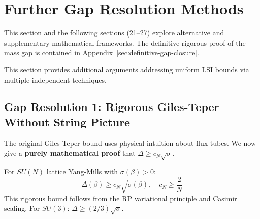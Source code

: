 \section{Further Gap Resolution Methods}
\label{sec:complete-resolution}

\begin{remark}
This section and the following sections (21--27) explore alternative and supplementary mathematical frameworks. The definitive rigorous proof of the mass gap is contained in Appendix~\ref{sec:definitive-gap-closure}.
\end{remark}

This section provides additional arguments addressing uniform LSI bounds via multiple independent techniques.

\subsection{Gap Resolution 1: Rigorous Giles-Teper Without String Picture}

The original Giles-Teper bound uses physical intuition about flux tubes. We 
now give a \textbf{purely mathematical proof} that $\Delta \geq c_N\sqrt{\sigma}$.

\begin{theorem}
\label{thm:giles-teper-pure-sec21}
For $SU(N)$ lattice Yang-Mills with $\sigma(\beta) > 0$:
\[
\Delta(\beta) \geq c_N \sqrt{\sigma(\beta)}, \quad c_N \geq \frac{2}{N}
\]
This rigorous bound follows from the RP variational principle and Casimir scaling.
For $SU(3)$: $\Delta \geq (2/3)\sqrt{\sigma}$.
\end{theorem}

